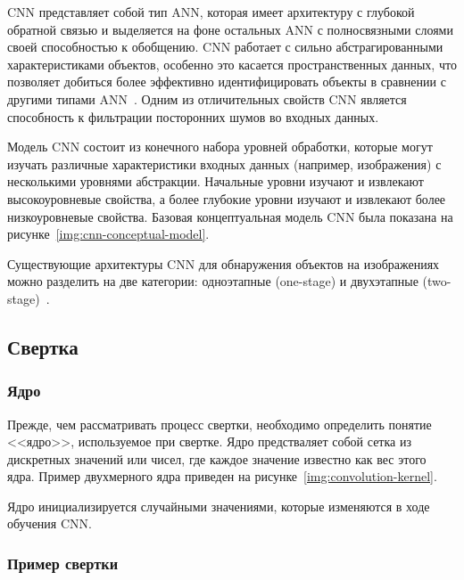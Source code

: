 CNN представляет собой тип ANN, которая имеет архитектуру с глубокой обратной связью и выделяется на фоне остальных ANN с полносвязными слоями своей способностью к обобщению. CNN работает с сильно абстрагированными характеристиками объектов, особенно это касается пространственных данных, что позволяет добиться более эффективно идентифицировать объекты в сравнении с другими типами ANN~\cite{cnn}. Одним из отличительных свойств CNN является способность к фильтрации посторонних шумов во входных данных.

Модель CNN состоит из конечного набора уровней обработки, которые могут изучать различные характеристики входных данных (например, изображения) с несколькими уровнями абстракции. Начальные уровни изучают и извлекают высокоуровневые свойства, а более глубокие уровни изучают и извлекают более низкоуровневые свойства. Базовая концептуальная модель CNN была показана на рисунке~\ref{img:cnn-conceptual-model}.



Существующие архитектуры CNN для обнаружения объектов на изображениях можно разделить на две категории: одноэтапные (one-stage) и двухэтапные (two-stage)~\cite{review-on-one-stage-object-detection}.    

\subsection{Свертка}

\subsubsection*{Ядро}

Прежде, чем рассматривать процесс свертки, необходимо определить понятие <<ядро>>, используемое при свертке. Ядро предстваляет собой сетка из дискретных значений или чисел, где каждое значение известно как вес этого ядра. Пример двухмерного ядра приведен на рисунке~\ref{img:convolution-kernel}.


Ядро инициализируется случайными значениями, которые изменяются в ходе обучения CNN.

\subsubsection*{Пример свертки}

